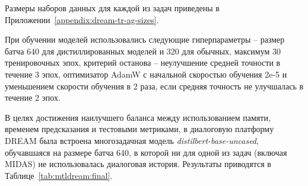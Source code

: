 Размеры наборов данных для каждой из задач приведены в Приложении~\ref{appendix:dream-tr-ag-sizes}. 

При обучении моделей использовались следующие гиперпараметры -- размер батча 640 для дистиллированных моделей и 320 для обычных, максимум 30 тренировочных эпох, критерий останова -- неулучшение средней точности в течение 3 эпох, оптимизатор AdamW с начальной скоростью обучения 2e-5 и уменьшением скорости обучения в 2 раза, если средняя точность не улучшалась в течение 2 эпох.

В целях достижения наилучшего баланса между использованием памяти, временем предсказания и тестовыми метриками, в диалоговую платформу {DREAM} была встроена многозадачная модель \textit{distilbert-base-uncased}, обучавшаяся на размере батча 640, в которой ни для одной из задач (включая MIDAS) не использовалась диалоговая история.
Результаты приводятся в Таблице~\ref{tab:mtldream:final}.

